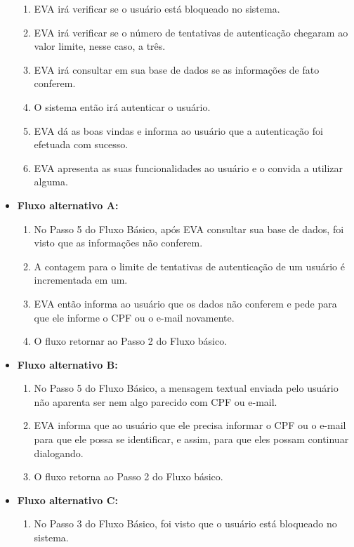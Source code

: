 \begin{itemize}
\begin{enumerate}
            \item EVA irá verificar se o usuário está bloqueado no sistema.
            \item EVA irá verificar se o número de tentativas de autenticação chegaram ao valor limite, nesse caso, a três.
            \item EVA irá consultar em sua base de dados se as informações de fato conferem.
            \item O sistema então irá autenticar o usuário.
            \item EVA dá as boas vindas e informa ao usuário que a autenticação foi efetuada com sucesso.
            \item EVA apresenta as suas funcionalidades ao usuário e o convida a utilizar alguma.
        \end{enumerate}
    \item \textbf{Fluxo alternativo A:}
        \begin{enumerate}
            \item No Passo 5 do Fluxo Básico, após EVA consultar sua base de dados, foi visto que as informações não conferem.
            \item A contagem para o limite de tentativas de autenticação de um usuário é incrementada em um.
            \item EVA então informa ao usuário que os dados não conferem e pede para que ele informe o CPF ou o e-mail novamente.
            \item O fluxo retornar ao Passo 2 do Fluxo básico.
        \end{enumerate}
    \item \textbf{Fluxo alternativo B:}
        \begin{enumerate}
            \item No Passo 5 do Fluxo Básico, a mensagem textual enviada pelo usuário não aparenta ser nem algo parecido com CPF ou e-mail.
            \item EVA informa que ao usuário que ele precisa informar o CPF ou o e-mail para que ele possa se identificar, e assim, para que eles possam continuar dialogando.
            \item O fluxo retorna ao Passo 2 do Fluxo básico.
        \end{enumerate}
    \item \textbf{Fluxo alternativo C:}
        \begin{enumerate}
            \item No Passo 3 do Fluxo Básico, foi visto que o usuário está bloqueado no sistema.

\end{enumerate}
\end{itemize}
